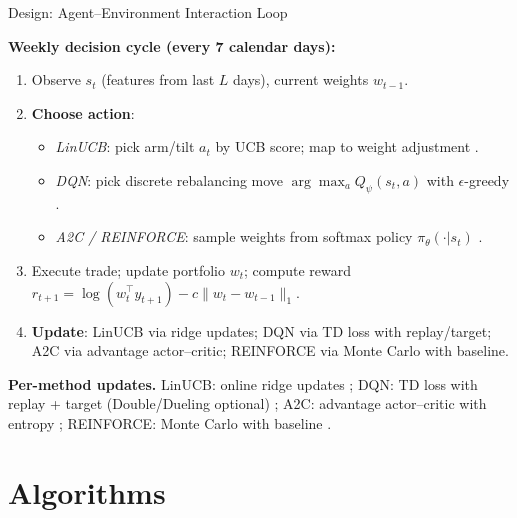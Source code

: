 \documentclass[aspectratio=169]{beamer}
\begin{document}
\begin{frame}{Design: Agent–Environment Interaction Loop}
\small

\textbf{Weekly decision cycle (every 7 calendar days):}
\begin{enumerate}\setlength{\itemsep}{1pt}
  \item Observe $s_t$ (features from last $L$ days), current weights $w_{t-1}$.
  \item \textbf{Choose action}:
    \begin{itemize}\setlength{\itemsep}{0pt}
      \item \emph{LinUCB}: pick arm/tilt $a_t$ by UCB score; map to weight adjustment \citep{li2010linucb}.
      \item \emph{DQN}: pick discrete rebalancing move $\arg\max_a Q_\psi(s_t,a)$ with $\epsilon$-greedy \citep{mnih2015dqn,vanhasselt2016ddqn,wang2016dueling}.
      \item \emph{A2C / REINFORCE}: sample weights from softmax policy $\pi_\theta(\cdot|s_t)$ \citep{mnih2016a3c, williams1992reinforce}.
    \end{itemize}
  \item Execute trade; update portfolio $w_t$; compute reward $r_{t+1}=\log(w_t^\top y_{t+1})-c\|w_t-w_{t-1}\|_1$.
  \item \textbf{Update}: LinUCB via ridge updates; DQN via TD loss with replay/target; A2C via advantage actor--critic; REINFORCE via Monte Carlo with baseline.
\end{enumerate}

\vspace{0.25em}
{\scriptsize
\textbf{Per-method updates.}
LinUCB: online ridge updates \citep{li2010linucb};
DQN: TD loss with replay + target (Double/Dueling optional) \citep{mnih2015dqn,vanhasselt2016ddqn,wang2016dueling};
A2C: advantage actor--critic with entropy \citep{mnih2016a3c};
REINFORCE: Monte Carlo with baseline \citep{williams1992reinforce}.
}
\end{frame}


\section{Algorithms}
\end{document}
